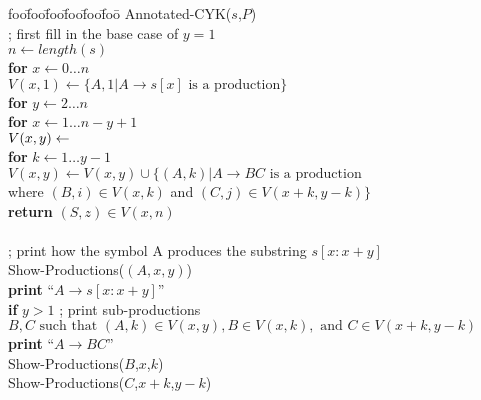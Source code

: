 \documentclass[12pt]{article}
\newenvironment{alg}{
\begin{tabbing}
foo\=foo\=foo\=foo\=foo\=foo\= \kill}
{\end{tabbing}}
\begin{document}
\begin{alg}
{\sc Annotated-CYK}($s$,$P$) \\
\> ; first fill in the base case of $y=1$ \\ 
\> $n \leftarrow \mathit{length}(s)$ \\ 
\> {\bf for} $x \leftarrow 0 \dots n$ \\
\> \> $V(x,1) \leftarrow \{A,1 | A \rightarrow s[x] \mbox{ is a production} \}$ \\
\> {\bf for} $y \leftarrow 2 \dots n$ \\
\> \> {\bf for} $x \leftarrow 1 \dots n - y + 1$ \\
\> \> \> $V(x,y) \leftarrow \empty$ \\
\> \> \> {\bf for} $k \leftarrow 1 \dots y - 1$ \\
\> \> \> \> $V(x,y) \leftarrow V(x,y) \cup \{ (A,k) | A \rightarrow BC \mbox{ is a production}$ \\
\> \> \> \> \> where $(B,i) \in V(x,k)$ and $(C,j) \in V(x+k,y-k) \}$ \\
\> {\bf return} $(S,z) \in V(x,n)$ \\
\\
; print how the symbol A produces the substring $s[x:x+y]$ \\
{\sc Show-Productions}($(A,x,y)$) \\
\> {\bf print} ``$A \rightarrow s[x:x+y]$'' \\
\> {\bf if} $y>1$ ; print sub-productions \\
\> \> $B,C \mbox{ such that } (A,k) \in V(x,y), B \in V(x,k), \mbox{ and } C \in V(x+k,y-k)$ \\
\> \> {\bf print} ``$A \rightarrow BC$'' \\
\> \> {\sc Show-Productions}($B$,$x$,$k$) \\
\> \> {\sc Show-Productions}($C$,$x+k$,$y-k$) \\
\end{alg}
\end{document}
